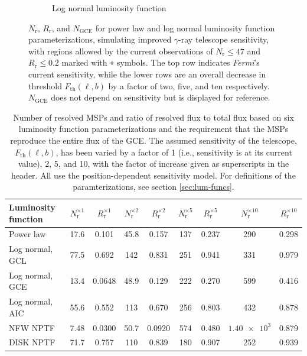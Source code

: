 \documentclass[a4paper,11pt]{article}
\newcommand{\comment}[1]{\emph{\color{red}{#1}}}
\begin{document}
\begin{figure}
\begin{subfigure}[b]{0.32\textwidth}
        \caption{Log normal luminosity function }
    \end{subfigure}
    \caption{$N_\text{r}$, $R_\text{r}$, and $N_\text{GCE}$ for power law and log normal luminosity function parameterizations, simulating improved $\gamma$-ray telescope sensitivity, with regions allowed by the current observations of $N_\text{r}\leq 47$ and $R_\text{r} \leq 0.2$ marked with \texttt{+} symbols. The top row indicates \textit{Fermi}'s current sensitivity, while the lower rows are an overall decrease in threshold $F_\text{th}(\ell, b)$ by a factor of two, five, and ten respectively. $N_\text{GCE}$ does not depend on sensitivity but is displayed for reference.}
    \label{fig:sensitivity-results}
\end{figure}

\begin{table}
    \centering
    \begin{tabular}{|l | c c | c c | c c | c c |}
        \hline
        Luminosity function & $N_\text{r}^{\times 1}$ & $R_\text{r}^{\times 1}$ & $N_\text{r}^{\times 2}$ & $R_\text{r}^{\times 2}$ & $N_\text{r}^{\times 5}$ & $R_\text{r}^{\times 5}$ & $N_\text{r}^{\times 10}$ & $R_\text{r}^{\times 10}$\\ \hline \hline
        Power law & 17.6 & 0.101 & 45.8 & 0.157 & 137 & 0.237 & 290 & 0.298 \\
        Log normal, GCL & 77.5 & 0.692 & 142 & 0.831 & 251 & 0.941 & 331 & 0.979 \\
        Log normal, GCE & 13.4 & 0.0648 & 48.9 & 0.129 & 222 & 0.270 & 599 & 0.416  \\
        Log normal, AIC & 55.6 & 0.552 & 113 & 0.670 & 256 & 0.803 & 432 & 0.878  \\
        NFW NPTF & 7.48 & 0.0300 & 50.7 & 0.0920 & 574 & 0.480 & $\num{1.40e3}$ & 0.879 \\
        DISK NPTF & 71.7 & 0.757 & 110 & 0.839 & 180 & 0.907 & 252 & 0.939 \\
        \hline
    \end{tabular}
    \caption{Number of resolved MSPs and ratio of resolved flux to total flux based on six luminosity function parameterizations and the requirement that the MSPs reproduce the entire flux of the GCE. The assumed sensitivity of the telescope, $F_\text{th}(\ell, b)$, has been varied by a factor of 1 (i.e., sensitivity is at its current value), 2, 5, and 10, with the factor of increase given as superscripts in the header. All use the position-dependent sensitivity model. For definitions of the paramterizations, see section \ref{sec:lum-funcs}. \comment{Maybe this should be a plot.}}
    \label{tab:sensitivity-values}
\end{table}
\end{document}
